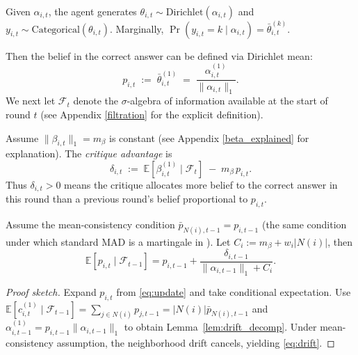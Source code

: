 \begin{definition}
\label{def:dcm}
Given \(\alpha_{i,t}\), the agent generates \(\theta_{i,t}\sim\mathrm{Dirichlet}(\alpha_{i,t})\)
and \(y_{i,t}\sim\mathrm{Categorical}(\theta_{i,t})\).
Marginally, \(\Pr(y_{i,t}=k\mid \alpha_{i,t})=\bar\theta^{(k)}_{i,t}\).
\end{definition}

Then the belief in the correct answer can be defined via Dirichlet mean:
\begin{equation}
p_{i,t} \;:=\; \bar\theta^{(1)}_{i,t} \;=\; \frac{\alpha^{(1)}_{i,t}}{\|\alpha_{i,t}\|_1}.
\label{eq:pt}
\end{equation}
We next let $\mathcal{F}_t$ denote the $\sigma$-algebra of information available at the start of round $t$ (see Appendix \ref{filtration} for the explicit definition).

\begin{definition}
\label{def:adv}
Assume \(\|\beta_{i,t}\|_1=m_\beta\) is constant (see Appendix \ref{beta_explained} for explanation).
The \emph{critique advantage} is
\begin{equation}
\delta_{i,t}\;:=\;\mathbb{E}\!\left[\beta^{(1)}_{i,t}\mid\mathcal{F}_{t}\right] \;-\; m_\beta\, p_{i,t}.
\label{eq:adv}
\end{equation}
Thus \(\delta_{i,t}>0\) means the critique allocates more belief to the correct answer in this round than a previous round's belief proportional to \(p_{i,t}\).
\end{definition}



\begin{theorem}
\label{thm:drift}
Assume the mean-consistency condition \(\bar p_{N(i),t-1}=p_{i,t-1}\)
(the same condition under which standard MAD is a martingale in \cite{choi2025debate}). Let \(C_i:=m_\beta+w_i|N(i)|\), 
then
\begin{equation}
\mathbb{E}\!\left[p_{i,t}\mid \mathcal{F}_{t-1}\right]
=
p_{i,t-1}
+\frac{\delta_{i,t-1}}{\|\alpha_{i,t-1}\|_1+C_i}.
\label{eq:drift}
\end{equation}
\end{theorem}

\begin{proof}[Proof sketch]
Expand \(p_{i,t}\) from \eqref{eq:update} and take conditional expectation.
Use \(\mathbb{E}[c^{(1)}_{i,t}\mid\mathcal{F}_{t-1}]=\sum_{j\in N(i)}p_{j,t-1}=|N(i)|\bar p_{N(i),t-1}\)
and \(\alpha^{(1)}_{i,t-1}=p_{i,t-1}\|\alpha_{i,t-1}\|_1\) to obtain Lemma~\ref{lem:drift_decomp}.
Under mean-consistency assumption, the neighborhood drift cancels, yielding \eqref{eq:drift}.
\end{proof}

